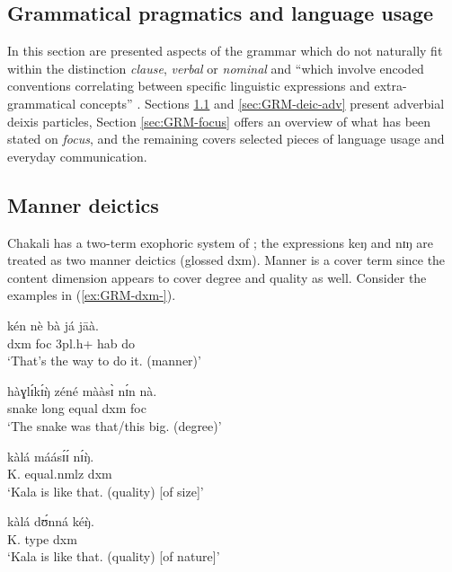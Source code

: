 \begin{exe}
\begin{exe}
\begin{exe}
\begin{exe}
\begin{exe}
\begin{exe}
\begin{exe}
\begin{exe}
\begin{exe}
\begin{exe}
\begin{exe}
\begin{exe}
\section{Grammatical pragmatics and language usage}
\label{sec:GRM-adjuncts}

In this section are presented aspects of the grammar which do not naturally fit within the distinction \textit{clause},  \textit{verbal} or \textit{nominal} and ``which involve encoded conventions correlating between specific linguistic expressions and extra-grammatical concepts'' \citep[256]{arie10}. Sections \ref{sec:GRM-adv-pro} and \ref{sec:GRM-deic-adv} present  adverbial deixis particles, Section \ref{sec:GRM-focus} offers an overview of what has been stated on \textit{focus}, and the remaining covers selected  pieces of language usage and everyday communication. 


\subsection{Manner deictics}
\label{sec:GRM-adv-pro}

Chakali has a two-term exophoric system of  \citep{koen12}; the  expressions  {\sls keŋ} and {\sls nɪŋ} are treated as  two manner deictics  (glossed {\sc dxm}).  Manner is a cover term since the content dimension appears to cover degree and  quality as well. Consider the examples in (\ref{ex:GRM-dxm-}).

\ea\label{ex:GRM-dxm-}
 \ea\label{ex:GRM-dxm-1}
\gll kén nè bà já jāà.\\
{\sc dxm} {\sc foc}  {\sc 3pl.h+}  {\sc hab} do  \\
\glt `That's the way to do it. (manner)'  

  \ex\label{ex:GRM-dxm-2}
\gll  hàɣlɪ́kɪ́ŋ̀ zéné mààsɪ̀ nɪ́n nà.\\
snake long equal {\sc dxm}  {\sc foc}\\
\glt `The snake was that/this big. (degree)'  

  \ex\label{ex:GRM-dxm-3}
  
  
\gll  kàlá máásɪ́ɪ́ nɪ́ŋ̀.\\
K. equal.{\sc nmlz} {\sc dxm}\\
\glt `Kala is like that. (quality) [of size]'  

  \ex\label{ex:GRM-dxm-4}
  
  
\gll kàlá dʊ́nná kéŋ̀.\\
K. type {\sc dxm}\\
\glt `Kala is like that. (quality) [of nature]'  


\end{exe}
\end{exe}
\end{exe}
\end{exe}
\end{exe}
\end{exe}
\end{exe}
\end{exe}
\end{exe}
\end{exe}
\end{exe}
\end{exe}
